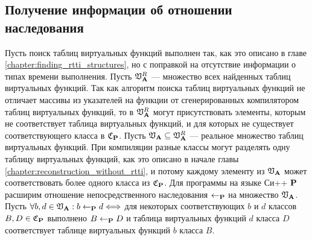 



\subsection{Получение информации об отношении наследования}
\label{chapter:info_extraction}
Пусть поиск таблиц виртуальных функций выполнен так, как это описано в главе \ref{chapter:finding_rtti_structures}, но с поправкой на отсутствие информации о типах времени выполнения. Пусть $\mathfrak{V}_{\mathbf{A}}^R$ --- множество всех найденных таблиц виртуальных функций. Так как алгоритм поиска таблиц виртуальных функций не отличает массивы из указателей на функции от сгенерированных компилятором таблиц виртуальных функций, то в $\mathfrak{V}_{\mathbf{A}}^R$ могут присутствовать элементы, которым не соответствует таблица виртуальных функций, и для которых не существует соответствующего класса в $\mathfrak{C}_{\mathbf{P}}$. Пусть $\mathfrak{V}_{\mathbf{A}} \subseteq \mathfrak{V}_{\mathbf{A}}^R$ --- реальное множество таблиц виртуальных функций. При компиляции разные классы могут разделять одну таблицу виртуальных функций, как это описано в начале главы \ref{chapter:reconstruction_without_rtti}, и потому каждому элементу из $\mathfrak{V}_{\mathbf{A}}$ может соответствовать более одного класса из $\mathfrak{C}_{\mathbf{P}}$. Для программы на языке Си++ $\mathbf{P}$ расширим отношение непосредственного наследования $\leftarrow_{\mathbf{P}}$ на множество $\mathfrak{V}_{\mathbf{A}}$. Пусть $\forall b, d \in \mathfrak{V}_{\mathbf{A}}: b \leftarrow_{\mathbf{P}} d \Longleftrightarrow$ для некоторых соответствующих $b$ и $d$ классов $B, D \in \mathfrak{C}_{\mathbf{P}}$ выполнено $B \leftarrow_{\mathbf{P}} D$ и таблица виртуальных функций $d$ класса $D$ соответствует таблице виртуальных функций $b$ класса $B$.

